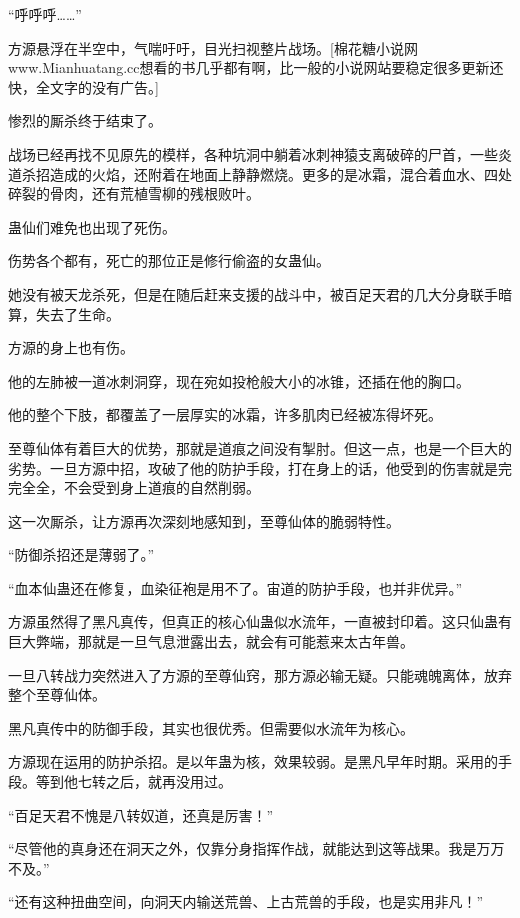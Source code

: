 
\begin{this_body}

“呼呼呼……”

方源悬浮在半空中，气喘吁吁，目光扫视整片战场。[棉花糖小说网www.Mianhuatang.cc想看的书几乎都有啊，比一般的小说网站要稳定很多更新还快，全文字的没有广告。]

惨烈的厮杀终于结束了。

战场已经再找不见原先的模样，各种坑洞中躺着冰刺神猿支离破碎的尸首，一些炎道杀招造成的火焰，还附着在地面上静静燃烧。更多的是冰霜，混合着血水、四处碎裂的骨肉，还有荒植雪柳的残根败叶。

蛊仙们难免也出现了死伤。

伤势各个都有，死亡的那位正是修行偷盗的女蛊仙。

她没有被天龙杀死，但是在随后赶来支援的战斗中，被百足天君的几大分身联手暗算，失去了生命。

方源的身上也有伤。

他的左肺被一道冰刺洞穿，现在宛如投枪般大小的冰锥，还插在他的胸口。

他的整个下肢，都覆盖了一层厚实的冰霜，许多肌肉已经被冻得坏死。

至尊仙体有着巨大的优势，那就是道痕之间没有掣肘。但这一点，也是一个巨大的劣势。一旦方源中招，攻破了他的防护手段，打在身上的话，他受到的伤害就是完完全全，不会受到身上道痕的自然削弱。

这一次厮杀，让方源再次深刻地感知到，至尊仙体的脆弱特性。

“防御杀招还是薄弱了。”

“血本仙蛊还在修复，血染征袍是用不了。宙道的防护手段，也并非优异。”

方源虽然得了黑凡真传，但真正的核心仙蛊似水流年，一直被封印着。这只仙蛊有巨大弊端，那就是一旦气息泄露出去，就会有可能惹来太古年兽。

一旦八转战力突然进入了方源的至尊仙窍，那方源必输无疑。只能魂魄离体，放弃整个至尊仙体。

黑凡真传中的防御手段，其实也很优秀。但需要似水流年为核心。

方源现在运用的防护杀招。是以年蛊为核，效果较弱。是黑凡早年时期。采用的手段。等到他七转之后，就再没用过。

“百足天君不愧是八转奴道，还真是厉害！”

“尽管他的真身还在洞天之外，仅靠分身指挥作战，就能达到这等战果。我是万万不及。”

“还有这种扭曲空间，向洞天内输送荒兽、上古荒兽的手段，也是实用非凡！”


\end{this_body}
